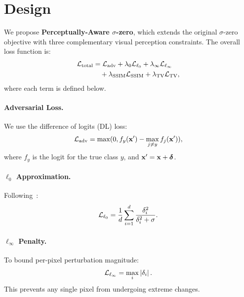 \section{Design}
\label{sec:method}

We propose \textbf{Perceptually-Aware $\sigma$-zero}, which extends the original $\sigma$-zero objective with three complementary visual perception constraints. The overall loss function is:
\begin{align}
    {\cal L}_{\text{total}} &= {\cal L}_{\text{adv}} + \lambda_0 {\cal L}_{\ell_0} + \lambda_{\infty} {\cal L}_{\ell_\infty} \nonumber \\
    &\quad + \lambda_{\text{SSIM}} {\cal L}_{\text{SSIM}} + \lambda_{\text{TV}} {\cal L}_{\text{TV}},
    \label{eq:total_loss}
\end{align}
where each term is defined below.

\paragraph{Adversarial Loss.} We use the difference of logits (DL) loss:
\begin{equation}
    {\cal L}_{\text{adv}} = \max(0, f_y(\mathbf{x}') - \max_{j \neq y} f_j(\mathbf{x}')),
\end{equation}
where $f_y$ is the logit for the true class $y$, and $\mathbf{x}' = \mathbf{x} + \boldsymbol{\delta}$.

\paragraph{$\ell_0$ Approximation.} Following~\cite{cina2025sigma}:
\begin{equation}
    {\cal L}_{\ell_0} = \frac{1}{d} \sum_{i=1}^{d} \frac{\delta_i^2}{\delta_i^2 + \sigma}.
\end{equation}

\paragraph{$\ell_\infty$ Penalty.} To bound per-pixel perturbation magnitude:
\begin{equation}
    {\cal L}_{\ell_\infty} = \max_i \left|\delta_i\right|.
\end{equation}
This prevents any single pixel from undergoing extreme changes.

